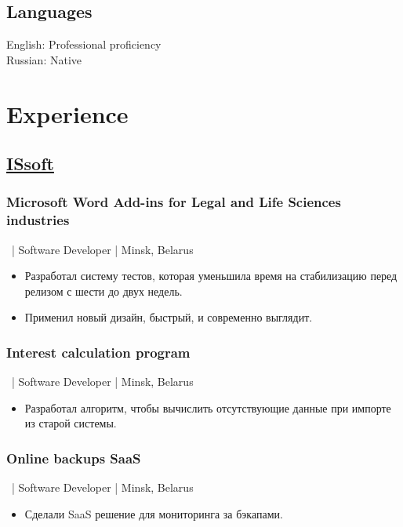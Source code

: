 \documentclass{article}
\begin{document}
\begin{minipage}[t]{0.39\textwidth}
    \subsection*{Languages}
    English: Professional proficiency\\
    Russian: Native

  \end{minipage}
  \begin{minipage}[t]{0.6\textwidth}

    \section*{Experience}
    \subsection*{\href{http://www.issoft.by/}{ISsoft}}
	\subsubsection*{Microsoft Word Add-ins for Legal and Life Sciences industries}
    \ | Software Developer | Minsk, Belarus
    \begin{itemize}
      \item Разработал систему тестов, которая уменьшила время на стабилизацию перед релизом с шести до двух недель.
      \item Применил новый дизайн, быстрый, и современно выглядит.
    \end{itemize}
	
	\subsubsection*{Interest calculation program}
    \ | Software Developer | Minsk, Belarus
	\begin{itemize}
      \item Разработал алгоритм, чтобы вычислить отсутствующие данные при импорте из старой системы.
    \end{itemize}

	\subsubsection*{Online backups SaaS}
	\ | Software Developer | Minsk, Belarus
    \begin{itemize}
      \item Сделали SaaS решение для мониторинга за бэкапами.
    \end{itemize}
	

\end{minipage}
\end{document}
